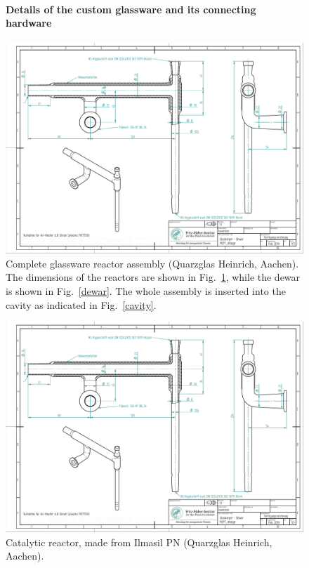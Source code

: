\documentclass[12pt]{article}
\begin{document}
\clearpage
\begin{figure}[p]
\paragraph{Details of the custom glassware and its connecting hardware \vspace{1em}}
\begin{center}
\includegraphics[page=3, width=1.25\linewidth, angle=90]{dewar+reactor.pdf}
\caption{Complete glassware reactor assembly (Quarzglas Heinrich, Aachen). The dimensions of the reactors are shown in Fig.~\ref{reactor}, while the dewar is shown in Fig.~\ref{dewar}. The whole assembly is inserted into the cavity as indicated in Fig.~\ref{cavity}.}
\end{center}
\end{figure}

\begin{figure}[p]
\centering
\includegraphics[page=2, width=1.35\linewidth, angle=90]{dewar+reactor.pdf}
\caption{Catalytic reactor, made from Ilmasil PN (Quarzglas Heinrich, Aachen). \label{reactor}}
\end{figure}
\end{document}
